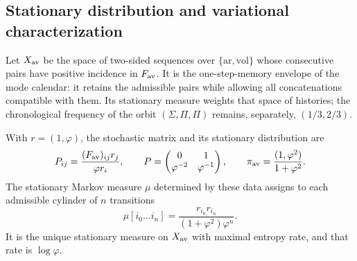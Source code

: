 \subsection{Stationary distribution and variational characterization}
\label{v:subsec:parry-explicita}

Let \(X_{\rm av}\) be the space of two-sided sequences over
\(\{\mathrm{ar},\mathrm{vol}\}\) whose consecutive pairs have
positive incidence in \(F_{\rm av}\). It is the one-step-memory envelope
of the mode calendar: it retains the admissible pairs while allowing
all concatenations compatible with them. Its stationary
measure weights that space of histories; the chronological frequency
of the orbit \((\Sigma,\Pi,\Pi)\) remains, separately,
\((1/3,2/3)\).

\begin{proposition}
\label{v:prop:parry-explicita}
With \(r=(1,\varphi)\), the stochastic matrix and its stationary
distribution are
\begin{equation}
 P_{ij}=\frac{(F_{\rm av})_{ij}r_j}{\varphi r_i},\qquad
 P=\begin{pmatrix}0&1\\\varphi^{-2}&\varphi^{-1}\end{pmatrix},
 \qquad
 \pi_{\rm av}=\frac{(1,\varphi^2)}{1+\varphi^2}.
 \label{v:eq:parry-transicion-estacionaria}
\end{equation}
The stationary Markov measure \(\mu\) determined by these data
assigns to each admissible cylinder of \(n\) transitions
\begin{equation}
 \mu[i_0\ldots i_n]
 =\frac{r_{i_0}r_{i_n}}{(1+\varphi^2)\varphi^n}.
 \label{v:eq:parry-cilindros}
\end{equation}
It is the unique stationary measure on \(X_{\rm av}\) with maximal
entropy rate, and that rate is \(\log\varphi\).
\end{proposition}

